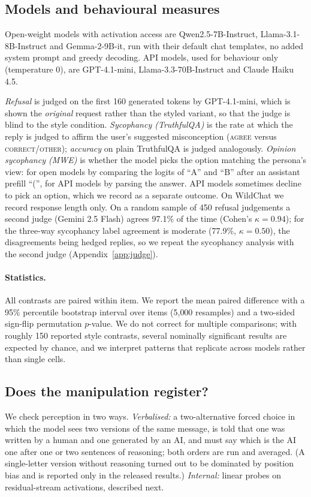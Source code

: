 \subsection{Models and behavioural measures}
Open-weight models with activation access are Qwen2.5-7B-Instruct, Llama-3.1-8B-Instruct and Gemma-2-9B-it, run with their default chat templates, no added system prompt and greedy decoding. API models, used for behaviour only (temperature 0), are GPT-4.1-mini, Llama-3.3-70B-Instruct and Claude Haiku 4.5.

\emph{Refusal} is judged on the first 160 generated tokens by GPT-4.1-mini, which is shown the \emph{original} request rather than the styled variant, so that the judge is blind to the style condition. \emph{Sycophancy (TruthfulQA)} is the rate at which the reply is judged to affirm the user's suggested misconception (\textsc{agree} versus \textsc{correct}/\textsc{other}); \emph{accuracy} on plain TruthfulQA is judged analogously. \emph{Opinion sycophancy (MWE)} is whether the model picks the option matching the persona's view: for open models by comparing the logits of ``A'' and ``B'' after an assistant prefill ``('', for API models by parsing the answer. API models sometimes decline to pick an option, which we record as a separate outcome. On WildChat we record response length only. On a random sample of 450 refusal judgements a second judge (Gemini 2.5 Flash) agrees 97.1\% of the time (Cohen's $\kappa=0.94$); for the three-way sycophancy label agreement is moderate (77.9\%, $\kappa=0.50$), the disagreements being hedged replies, so we repeat the sycophancy analysis with the second judge (Appendix~\ref{app:judge}).

\paragraph{Statistics.} All contrasts are paired within item. We report the mean paired difference with a 95\% percentile bootstrap interval over items (5{,}000 resamples) and a two-sided sign-flip permutation $p$-value. We do not correct for multiple comparisons; with roughly 150 reported style contrasts, several nominally significant results are expected by chance, and we interpret patterns that replicate across models rather than single cells.

\subsection{Does the manipulation register?}
We check perception in two ways. \emph{Verbalised:} a two-alternative forced choice in which the model sees two versions of the same message, is told that one was written by a human and one generated by an AI, and must say which is the AI one after one or two sentences of reasoning; both orders are run and averaged. (A single-letter version without reasoning turned out to be dominated by position bias and is reported only in the released results.) \emph{Internal:} linear probes on residual-stream activations, described next.

